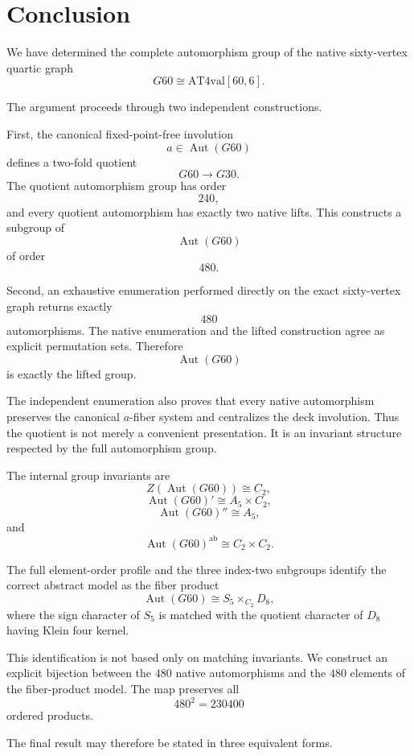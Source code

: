 \section{Conclusion}
\label{sec:conclusion}

We have determined the complete automorphism group of the native
sixty-vertex quartic graph
\[
G60\cong \mathrm{AT4val}[60,6].
\]

The argument proceeds through two independent constructions.

First, the canonical fixed-point-free involution
\[
a\in\operatorname{Aut}(G60)
\]
defines a two-fold quotient
\[
G60\longrightarrow G30.
\]
The quotient automorphism group has order
\[
240,
\]
and every quotient automorphism has exactly two native lifts. This
constructs a subgroup of
\[
\operatorname{Aut}(G60)
\]
of order
\[
480.
\]

Second, an exhaustive enumeration performed directly on the exact
sixty-vertex graph returns exactly
\[
480
\]
automorphisms. The native enumeration and the lifted construction agree
as explicit permutation sets. Therefore
\[
\operatorname{Aut}(G60)
\]
is exactly the lifted group.

The independent enumeration also proves that every native automorphism
preserves the canonical $a$-fiber system and centralizes the deck
involution. Thus the quotient is not merely a convenient presentation.
It is an invariant structure respected by the full automorphism group.

The internal group invariants are
\[
Z(\operatorname{Aut}(G60))\cong C_2,
\]
\[
\operatorname{Aut}(G60)'
\cong
A_5\times C_2,
\]
\[
\operatorname{Aut}(G60)''
\cong
A_5,
\]
and
\[
\operatorname{Aut}(G60)^{\mathrm{ab}}
\cong
C_2\times C_2.
\]

The full element-order profile and the three index-two subgroups identify
the correct abstract model as the fiber product
\[
\operatorname{Aut}(G60)
\cong
S_5\times_{C_2}D_8,
\]
where the sign character of $S_5$ is matched with the quotient character
of $D_8$ having Klein four kernel.

This identification is not based only on matching invariants. We
construct an explicit bijection between the $480$ native automorphisms
and the $480$ elements of the fiber-product model. The map preserves all
\[
480^2=230400
\]
ordered products.

The final result may therefore be stated in three equivalent forms.

